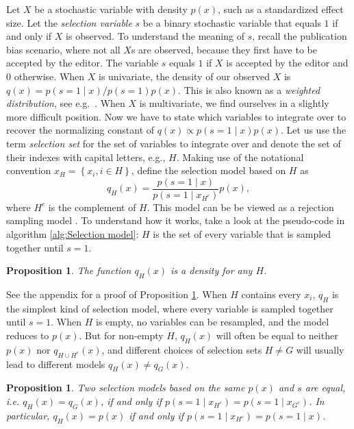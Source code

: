 \documentclass[useAMS,usenatbib,referee]{biom}
\newtheorem{prop}[theorem]{Proposition}
\begin{document}
Let $X$ be a stochastic variable with density $p(x)$, such as a standardized effect size. Let the \emph{selection variable} $s$ be a binary stochastic variable that equals $1$ if and only if $X$ is observed. To understand the meaning of $s$, recall the publication bias scenario, where not all $X$s are observed, because they first have to be accepted by the editor. The variable $s$ equals $1$ if $X$ is accepted by the editor and $0$ otherwise. When $X$ is univariate, the density of our observed $X$ is $q(x)=p(s=1\mid x)/p(s=1)p(x)$. This is also known as a \emph{weighted distribution}, see e.g.\ \citep[][eq. 3.1]{rao1985weighted}. When $X$ is multivariate, we find ourselves in a slightly more difficult position. Now we have to state which variables to integrate over to recover the normalizing constant of $q(x)\propto p(s=1\mid x)p(x)$. Let us use the term \emph{selection set} for the set of variables to integrate over and denote the set of their indexes with capital letters, e.g., $H$. Making use of the notational convention $x_{H}=\left\{ x_{i},i\in H\right\}$, define the selection model based on $H$ as
\begin{equation}
q_{H}(x)=\frac{p(s=1\mid x)}{p(s=1\mid x_{H^{c}})}p(x)\label{eq:H-selection model},
\end{equation}
where $H^c$ is the complement of $H$. This model can be be viewed as a rejection sampling model \citep{von1951various}. To understand how it works, take a look at the pseudo-code in algorithm \ref{alg:Selection model}: $H$ is the set of every variable that is sampled together until $s=1$.

\begin{prop}\label{prop:is density}
The function $q_{H}(x)$ is a density for any $H$.
\end{prop}
See the appendix for a proof of Proposition \ref{prop:is density}. When $H$ contains every $x_i$, $q_H$ is the simplest kind of selection model, where every variable is sampled together until $s=1$. When $H$ is empty, no variables can be resampled, and the model reduces to $p(x)$. But for non-empty $H$, $q_{H}(x)$ will often be equal to neither $p(x)$ nor $q_{H\cup H^c}(x)$, and different choices of selection sets $H\neq G$ will usually lead to different models $q_{H}(x)\neq q_{G}(x)$. 
\begin{prop}
\label{prop:Equal selection models}Two selection models based on the same $p(x)$ and $s$ are equal, i.e. $q_{H}(x)=q_{G}(x)$, if and only if $p(s=1\mid x_{H^{c}})=p(s=1\mid x_{G^{c}})$.
In particular, $q_{H}(x)=p(x)$ if and only if $p(s=1\mid x_{H^{c}})=p(s=1\mid x)$.
\end{prop}
\end{document}
